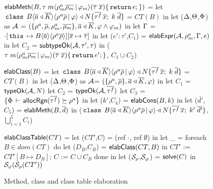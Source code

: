 \newcommand{\hdOf}[2]{\C{class}\; #1\angAlpha\inang{\rhoalloc\rhobar \,|\, #2} \extends \fbN}
\begin{figure}

\begin{codeml}
${\sf elabMeth}(B,\tau \; m\langle \rho^a_m\overline{\rho_m} \,|\, \varphi_m \rangle (\overline{\tau} \; \overline{x})\{\,{\tt return}\, e;\})$ = 
  let $\hdOf{B}{\varphi}\{\bar{\tau^f}\,\xbar;\;k\;\bar{d}\}$ = $CT(B)$ in
  let ($\Delta$,$\Theta$,$\Phi$) as ${\mathcal{A}}$ = 
            $(\{\rho^a,\overline{\rho},\rho^a_m,\overline{\rho_m}\},\overline{a} \triangleleft \overline{K},\varphi \wedge \varphi_m)$ in
  let $\Gamma$ = $\cdot[\,{\tt this}\, \mapsto B\langle \overline{a} \rangle\langle \rho^a\overline{\rho} \rangle][\overline{x} \mapsto \overline{\tau}]$ in
  let ($e':\tau'$,$C_1$) = ${\sf elabExpr} ({\mathcal{A}},\rho^a_m,\Gamma,e)$ in
  let $C_2$ = ${\sf subtypeOk}({{\mathcal{A}}},{\tau'},{\tau})$ in
    ($\tau \; m\langle \rho^a_m\overline{\rho_m} \,|\, \varphi_m \rangle (\overline{\tau} \; \overline{x})\{\,{\tt return}\, e';\}$, $C_1 \cup C_2$)
\end{codeml}

\begin{codeml}
${\sf elabClass}(B)$ = 
  let $\hdOf{B}{\varphi}\{\bar{\tau^f}\,\xbar;\;k\;\bar{d}\}$ = $CT(B)$ in
  let ($\Delta$,$\Theta$,$\Phi$) as ${\mathcal{A}}$= $(\{\rho^a,\overline{\rho}\},\overline{a} \triangleleft \overline{K},\varphi)$ in
  let $C_1$ = ${\sf typeOk}({{\mathcal{A}}},{N})$
  let $C_2$ = ${\sf typeOk}({{\mathcal{A}}},{\overline{\tau^f}})$
  let $C_3$ = $\{\Phi\,\vdash\,{\sf allocRgn}(\overline{\tau^f}) \succeq \rho^a\}$ in
  let ($k'$,$C_4$) = ${\sf elabCons}(B,k)$ in
  let ($\bar{d'}$,$C_5$) = ${\sf elabMeth}(B,\overline{d})$ in
    ($\hdOf{B}{\varphi}\{\bar{\tau^f}\,\xbar;\;k'\;\bar{d'}\}$, $\bigcup_{i=1}^5 C_i$)
\end{codeml}

\begin{codeml}
${\sf elabClassTable}(CT)$ = 
  let ($CT'$,$C$) = (ref $\cdot$, ref $\emptyset$) in
  let _ = foreach $B \in dom(CT)$ do
            let ($D_B$,$C_B$) = ${\sf elabClass}(CT,B)$ in
              $CT'$ := $CT'[B \mapsto D_B]$;
              $C$ := $C \cup C_B$
           done in
  let ($\mathcal{S}_\rho$,$\mathcal{S}_\varphi$) = ${\sf solve}(C)$ in
    $\mathcal{S}_\varphi(\mathcal{S}_\rho(CT')) $
      
\end{codeml}

\caption{Method, class and class table elaboration}
\label{fig:fb-elabmeth}
\end{figure}
